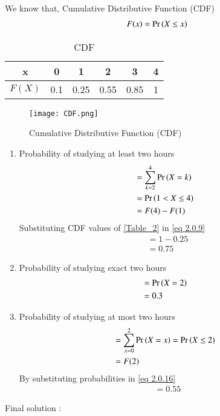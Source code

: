 \documentclass[journal,12pt,twocolumn]{IEEEtran}
\begin{document}
We know that, Cumulative Distributive Function (CDF) 
\begin{align}
    F(x) = \Pr\left(X \le x\right)
\end{align}
\begin{table}[ht]
  
  \centering
  \begin{tabular}{|c|c|c|c|c|c|}
    \hline
    x &  0 & 1 & 2 & 3 & 4\\
    \hline
    $F(X)$ & 0.1& 0.25& 0.55 & 0.85 & 1\\
    \hline
    
\end{tabular} 
\caption{CDF}
\label{Table_2}
\end{table}

\begin{figure}[ht]
    \centering
    \texttt{[image: CDF.png]}
    \caption{Cumulative Distributive Function (CDF) }
    \label{Figure_2}
\end{figure}

\vspace{3mm}
    \begin{enumerate}
        \item Probability of studying at least two hours 
        \begin{align}
            & = \sum_{k = 2}^4 \Pr\left(X = k\right)\\
            & = \Pr\left(1 < X \le 4\right)\\ 
            & =  F(4) - F(1)\label{eq 2.0.9}
        \end{align}
        Substituting CDF values of \eqref{Table_2} in \eqref{eq 2.0.9}
        \begin{align}
            &  = 1 - 0.25\\
            & = 0.75
        \end{align}
        
        \item Probability of studying exact two hours
        \begin{align}
            & = \Pr\left(X = 2\right)\\
            & = 0.3
        \end{align}
        
        \item Probability of studying at most two hours 
        \begin{align}
          & = \sum_{x = 0}^2  \Pr\left(X = x\right) = \Pr \left(X \le 2\right)\\
           & = F(2)\label{eq 2.0.16}
        \end{align}
        By substituting probabilities in \eqref{eq 2.0.16}
        \begin{align}
            & = 0.55
        \end{align}
    \end{enumerate}
  Final solution :  
  
\end{document}
